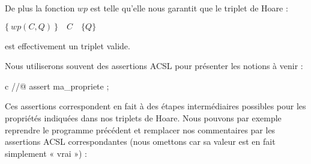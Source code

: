 De plus la fonction $wp$ est telle qu'elle nous garantit que le triplet de Hoare :
\begin{center}
$\{\ wp(C,Q)\ \}\quad C\quad \{ Q \}$
\end{center}
est effectivement un triplet valide.



Nous utiliserons souvent des assertions ACSL pour présenter les notions à
venir :



\begin{CodeBlock}{c}
//@ assert ma_propriete ;
\end{CodeBlock}



Ces assertions correspondent en fait à des étapes intermédiaires possibles pour
les propriétés indiquées dans nos triplets de Hoare. Nous pouvons par exemple
reprendre le programme précédent et remplacer nos commentaires par les assertions
ACSL correspondantes (nous omettons  car sa valeur est en fait simplement
« vrai ») :



